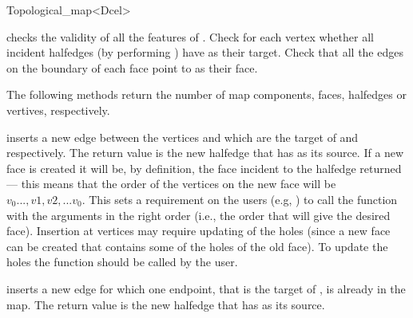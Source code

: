 \begin{ccRefClass}{Topological_map<Dcel>}
\ccPredicates
    
     { checks the validity of all the
       features of \ccVar . Check for each vertex 
       whether all incident halfedges (by performing
       ) have  as their
       target. 
       Check that all the edges on the boundary
       of each face  point to  as their
       face.} 

\ccQueryFunctions

    The following methods return the number of map components, faces,
    halfedges or vertives, respectively.

     {}
    \ccGlue
     {}
    \ccGlue
     {}

\ccModifiers

     {inserts a new edge
        between the vertices  and  which are the target
        of  and  respectively. The return value
        is the new halfedge that has  as its source.
        If a new face is created it will be, by definition, the face incident
        to the halfedge returned --- this means that the order of the vertices
        on the new face will be $v_0...,v1,v2,...v_0$.
        This sets a requirement on the users (e.g,
        ) to call the function with the arguments
        in the right order (i.e., the order that will give the desired face).
        Insertion at vertices may require updating of the holes  
        (since a 
        new face can be created that contains some of the holes of the old 
        face). To update the holes the function 
         should be called by the user.
        }

    {inserts a new edge for
             which one endpoint,  that is the target of
             , is already in the map.
             The return value is the new halfedge
             that has  as its source.
             }


\end{ccRefClass}
